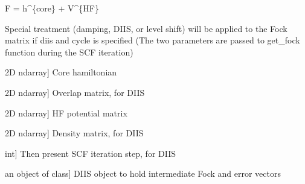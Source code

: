 \documentclass[letterpaper,10pt,english]{sphinxmanual}
\begin{document}
\begin{fulllineitems}
\begin{fulllineitems}
\end{fulllineitems}


\begin{fulllineitems}
\label{\detokenize{fcdft.wbl:fcdft.wbl.rks.WBLMoleculeRKS.get_fock}}
\pysigstartsignatures
\pysiglinewithargsret
{}
{\sphinxparamcomma {}\sphinxparamcomma {}\sphinxparamcomma {}\sphinxparamcomma {}\sphinxparamcomma {}\sphinxparamcomma {}\sphinxparamcomma {}\sphinxparamcomma {}\sphinxparamcomma {}}
{}
\pysigstopsignatures
\sphinxAtStartPar
F = h\textasciicircum{}\{core\} + V\textasciicircum{}\{HF\}

\sphinxAtStartPar
Special treatment (damping, DIIS, or level shift) will be applied to the
Fock matrix if diis and cycle is specified (The two parameters are passed
to get\_fock function during the SCF iteration)
\begin{description}
\begin{description}
\sphinxlineitem{h1e}{[}2D ndarray{]}
\sphinxAtStartPar
Core hamiltonian

\sphinxlineitem{s1e}{[}2D ndarray{]}
\sphinxAtStartPar
Overlap matrix, for DIIS

\sphinxlineitem{vhf}{[}2D ndarray{]}
\sphinxAtStartPar
HF potential matrix

\sphinxlineitem{dm}{[}2D ndarray{]}
\sphinxAtStartPar
Density matrix, for DIIS

\sphinxlineitem{cycle}{[}int{]}
\sphinxAtStartPar
Then present SCF iteration step, for DIIS

\sphinxlineitem{diis}{[}an object of  class{]}
\sphinxAtStartPar
DIIS object to hold intermediate Fock and error vectors


\end{description}
\end{description}
\end{fulllineitems}
\end{fulllineitems}
\end{document}

